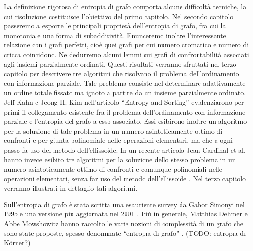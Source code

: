 La definizione rigorosa di entropia di grafo comporta alcune difficoltà tecniche, la cui risoluzione costituisce l'obiettivo del primo capitolo. Nel secondo capitolo passeremo a esporre le principali proprietà dell'entropia di grafo, fra cui la monotonia e una forma di subadditività. Enunceremo inoltre l'interessante relazione con i grafi perfetti, cioè quei grafi per cui numero cromatico e numero di cricca coincidono. Ne dedurremo alcuni lemmi sui grafi di confrontabilità associati agli insiemi parzialmente ordinati. Questi risultati verranno sfruttati nel terzo capitolo per descrivere tre algoritmi che risolvano il problema dell'ordinamento con informazione parziale. Tale problema consiste nel determinare adattivamente un ordine totale fissato ma ignoto a partire da un insieme parzialmente ordinato. Jeff Kahn e Jeong H. Kim nell'articolo ``Entropy and Sorting'' \cite{Kahn1995} evidenziarono per primi il collegamento esistente fra il problema dell'ordinamento con informazione parziale e l'entropia del grafo a esso associato. Essi esibirono inoltre un algoritmo per la soluzione di tale problema in un numero asintoticamente ottimo di confronti e per giunta polinomiale nelle operazioni elementari, ma che a ogni passo fa uso del metodo dell'ellissoide. In un recente articolo Jean Cardinal et al. hanno invece esibito tre algoritmi per la soluzione dello stesso problema in un numero asintoticamente ottimo di confronti e comunque polinomiali nelle operazioni elementari, senza far uso del metodo dell'ellissoide \cite{Cardinal2010}. Nel terzo capitolo verranno illustrati in dettaglio tali algoritmi.

Sull'entropia di grafo è stata scritta una esauriente survey da Gabor Simonyi nel 1995 \cite{Simonyi1995} e una versione più aggiornata nel 2001 \cite{Simonyi2001}. Più in generale, Matthias Dehmer e Abbe Mowshowitz hanno raccolto le varie nozioni di complessità di un grafo che sono state proposte, spesso denominate ``entropia di grafo'' \cite{Dehmer2011}. (TODO: entropia di K\"orner?)

